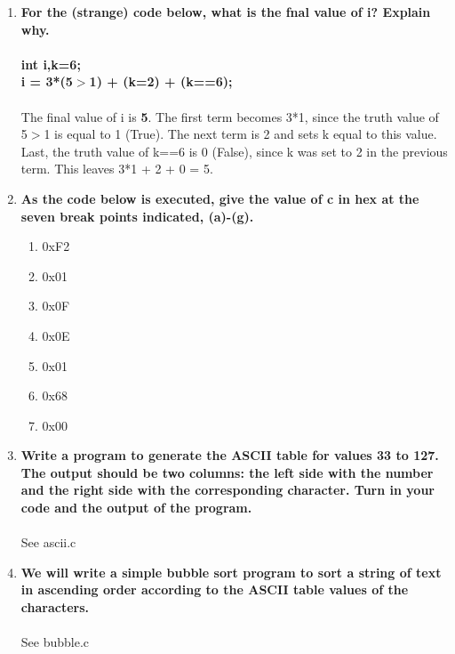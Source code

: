 \documentclass{article}
\begin{document}
\begin{enumerate}[label=\textbf{\arabic*})]
    \item \textbf{For the (strange) code below, what is the fnal value of i? Explain why. \\ \\
    int i,k=6; \\
    i = 3*(5$>$1) + (k=2) + (k==6);} \\ \\
    The final value of i is \textbf{5}. The first term becomes 3*1, since the truth value of 5$>$1 is equal to 1 (True). The next term is 2 and sets k equal to this value. Last, the truth value of k==6 is 0 (False), since k was set to 2 in the previous term. This leaves 3*1 + 2 + 0 = 5.

    \item \textbf{As the code below is executed, give the value of c in hex at the seven break points
    indicated, (a)-(g).}
    \begin{enumerate}[label=\textbf{\alph*}.]
        \item 0xF2
        \item 0x01
        \item 0x0F
        \item 0x0E
        \item 0x01
        \item 0x68
        \item 0x00
    \end{enumerate}

    \setcounter{enumi}{33}
    \item \textbf{Write a program to generate the ASCII table for values 33 to 127. The output should be
    two columns: the left side with the number and the right side with the corresponding
    character. Turn in your code and the output of the program.} \\ \\
    See ascii.c

    \item \textbf{We will write a simple bubble sort program to sort a string of text in ascending order
    according to the ASCII table values of the characters.} \\ \\
    See bubble.c


\end{enumerate}
\end{document}
